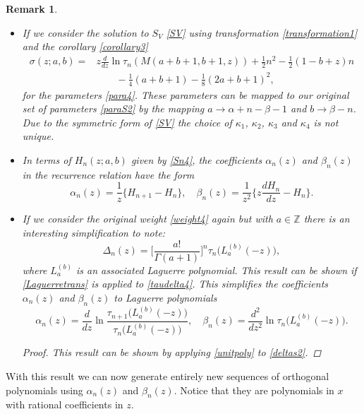 \documentclass[12pt]{article}
\def\Z{\mathbb{Z}}
\newtheorem{mydef3}{Remark}[section]
\numberwithin{figure}{section}
\numberwithin{equation}{section}
\numberwithin{table}{section}
\begin{document}
\begin{mydef3}{\quad \phantom{x}
\begin{itemize}
\item
If we consider the solution to $S_V$ \eqref{SV} using transformation \eqref{transformation1} and the corollary \eqref{corollary3}
\begin{align}
\sigma(z; a, b)=&z\frac{d}{dz}\ln
\tau_n(M({ a+ b+1, b+1,z}))+\tfrac{1}{2}n^2-\tfrac{1}{2}(1-b+z)n\nonumber\\&\qquad-\tfrac{1}{4}(a+b+1)-\tfrac{1}{8}(2a+b+1)^2\nonumber,
\end{align}
for the parameters \eqref{para4}. These parameters can be mapped to our original set of parameters \eqref{paraS2} by the mapping
$ a\rightarrow \alpha+n- \beta-1$ and $ b\rightarrow \beta-n$. Due to the symmetric form of \eqref{SV} the choice of $\kappa_1$, $\kappa_2$, $\kappa_3$ and $\kappa_4$ is not unique.
\item
In terms of $H_n(z; a, b)$ given by \eqref{Sn4}, the coefficients $\alpha_n(z)$ and $\beta_n(z)$ in the recurrence relation have the form
\begin{equation}\nonumber
\alpha_n(z)=\frac{1}{z}\bigg\{H_{n+1}-H_n\bigg\},\quad
\beta_n(z)=\frac{1}{z^2}\bigg\{z\frac{dH_n}{dz}-H_{n}\bigg\}.
\end{equation}
\item
If we consider the original weight \eqref{weight4} again but with $ a\in\Z$ there is an interesting simplification to note:
\begin{equation}
\Delta_n(z)=\bigg[\frac{ a!}{\Gamma( a+1)}\bigg]^n\tau_n\big(L^{( b)}_{ a}(-z)\big),\label{unitpoly}
\end{equation}
where $L_a^{(b)}$ is an associated Laguerre polynomial. This result can be shown if \eqref{Laguerretrans} is applied to \eqref{taudelta4}.
This simplifies the coefficients $\alpha_n(z)$ and $\beta_n(z)$ to Laguerre polynomials
\begin{equation}\nonumber
\alpha_n(z)=\frac{d}{dz}\ln\frac{\tau_{n+1}\big(L^{( b)}_{ a}(-z)\big)}{\tau_{n}\big(L^{( b)}_{ a}(-z)\big)},\quad \beta_n(z)=\frac{d^2}{dz^2}\ln\tau_n\big(L^{( b)}_{ a}(-z)\big).
\end{equation}
\begin{proof}
This result can be shown by applying \eqref{unitpoly} to \eqref{deltas2}.
\end{proof}
\end{itemize}}
\end{mydef3}
With this result we can now generate entirely new sequences of orthogonal polynomials using $\alpha_n(z)$ and $\beta_n(z)$. Notice that they are polynomials in $x$ with rational coefficients in $z$.
\end{document}
